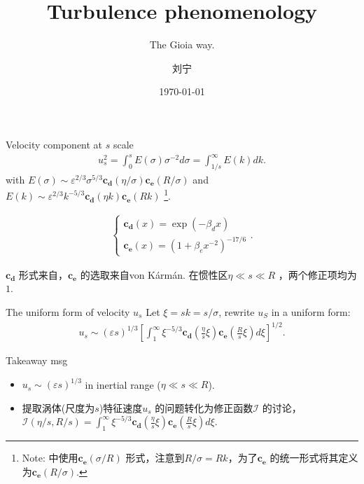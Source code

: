 \documentclass[10pt,xcolor={table,dvipsnames},t]{beamer}
\title{Turbulence phenomenology}
\subtitle{The Gioia way.}
\author{刘宁}
\institute{浙江大学}
\date{\today}
\begin{document}
\begin{frame}
  \titlepage
\end{frame}

\begin{frame}{Velocity component at $s$ scale}
    \begin{align*}
        u_s^2 = \int_0^s E(\sigma) \sigma^{-2} d\sigma = \int_{1 / s}^{\infty} E(k) dk
    .\end{align*}
    with $E(\sigma) \sim \varepsilon^{2 / 3} \sigma^{5 / 3} \mathbf{c_d} \left( \eta / \sigma \right) \mathbf{c_e} \left( R / \sigma \right)$ and $E(k) \sim \varepsilon^{2 / 3} k^{-5 / 3} \mathbf{c_d} (\eta k) \mathbf{c_e} \left( Rk \right) $ \footnote{Note: \citet{gioiaFriction2006}中使用$\mathbf{c_e} \left( \sigma / R \right) $ 形式，注意到$R / \sigma = Rk$，为了$\mathbf{c_e} $ 的统一形式将其定义为$\mathbf{c_e} \left( R / \sigma \right) $.}.

    \begin{align*}
        \begin{cases}
            \mathbf{c_d}\left( x \right)  = \exp\left( -\beta_d x \right) \\
            \mathbf{c_e} \left( x \right) = \left( 1+\beta_e x^{-2} \right) ^{-17 / 6} 
        \end{cases}
    .\end{align*}

    $\mathbf{c_d}$ 形式来自\citet{gioiaFriction2006}，$\mathbf{c_e}$ 的选取来自von K\'arm\'an. 在惯性区$\eta \ll s \ll R$ ，两个修正项均为$1$.
    
\end{frame}

\begin{frame}{The uniform form of velocity $u_s$}
    Let $\xi = sk = s / \sigma$, rewrite $u_S$ in a uniform form:
    \begin{align*}
        u_s \sim \left( \varepsilon s \right) ^{1 / 3} \left[ \int_1^{\infty} \xi^{-5 / 3} \mathbf{c_d}\left( \frac{\eta}{s} \xi \right) \mathbf{c_e} \left( \frac{R}{s} \xi \right) d\xi \right]^{1 / 2}  
    .\end{align*}
    \begin{block}{Takeaway msg}
        \begin{itemize}
            \item $u_s \sim \left( \varepsilon s \right) ^{1 / 3} $ in inertial range ($\eta \ll s \ll R$).
            \item 提取涡体(尺度为$s$)特征速度$u_s$ 的问题转化为修正函数$\mathcal{I}$ 的讨论，$\mathcal{I}\left( \eta / s, R / s \right)  = \int_1^{\infty} \xi^{-5 / 3} \mathbf{c_d}\left( \frac{\eta}{s} \xi \right) \mathbf{c_e} \left( \frac{R}{s} \xi \right) d\xi$.
        \end{itemize}
    \end{block}
\end{frame}
\end{document}
